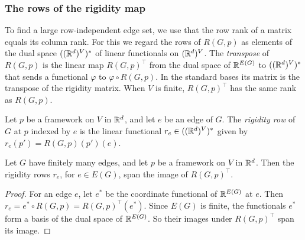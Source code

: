\subsubsection{The rows of the rigidity map}

To find a large row-independent edge set, we use that the row rank of
a matrix equals its column rank. For this we regard the rows of
$R(G, p)$ as elements of the dual space $(({\mathbb{R}}^{d})^{V})^{*}$ of linear
functionals on $({\mathbb{R}}^{d})^{V}$. The \emph{transpose} of $R(G, p)$ is
the linear map $R(G, p)^{\top}$ from the dual space of ${\mathbb{R}}^{E(G)}$ to
$(({\mathbb{R}}^{d})^{V})^{*}$ that sends a functional $\varphi$ to
$\varphi \circ R(G, p)$. In the standard bases its matrix is the
transpose of the rigidity matrix. When $V$ is finite, $R(G, p)^{\top}$
has the same rank as $R(G, p)$.

\begin{definition}
  \label{def:rigidityRow}
  \leanok
  Let $p$ be a framework on $V$ in ${\mathbb{R}}^{d}$, and let $e$ be an edge of
  $G$. The \emph{rigidity row} of $G$ at $p$ indexed by $e$ is the
  linear functional $r_e \in (({\mathbb{R}}^{d})^{V})^{*}$ given by
  $r_e(p') = R(G, p)(p')(e)$.
\end{definition}

\begin{lemma}
  \label{lem:span-range-rigidityRow}
  \leanok
  Let $G$ have finitely many edges, and let $p$ be a framework on $V$
  in ${\mathbb{R}}^{d}$. Then the rigidity rows $r_e$, for $e \in E(G)$, span
  the image of $R(G, p)^{\top}$.
\end{lemma}
\begin{proof}
  \leanok
  For an edge $e$, let $e^{*}$ be the coordinate functional of
  ${\mathbb{R}}^{E(G)}$ at $e$. Then
  $r_e = e^{*} \circ R(G, p) = R(G, p)^{\top}(e^{*})$. Since $E(G)$ is
  finite, the functionals $e^{*}$ form a basis of the dual space of
  ${\mathbb{R}}^{E(G)}$. So their images under $R(G, p)^{\top}$ span its image.
\end{proof}

